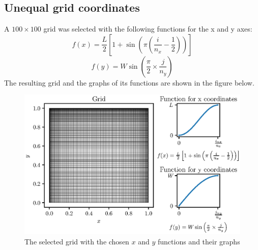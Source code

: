 \documentclass[12pt,a4paper,fleqn]{article}
\begin{document}
    \subsection*{Unequal grid coordinates}
    A $100\times100$ grid was selected with the following functions for the x and y axes:
    \begin{equation} \label{eq:xcoordinates}
    f(x)=\frac{L}{2}\left[ 1 + \sin\left(\pi\left(\frac{i}{n_x} -
    \frac{1}{2}\right)\right)\right]
    \end{equation}
    \begin{equation} \label{eq:ycoordinates}
    f(y)=W\sin\left(\frac{\pi}{2}\times\frac{j}{n_y}\right)
    \end{equation}
    The resulting grid and the graphs of its functions are shown in the figure below.
    \begin{figure}
        \centering
        \includegraphics[width=\linewidth]{../figures/gridAndGraph.eps}
        \caption{The selected grid with the chosen $x$ and $y$ functions and their graphs}
        \label{fig:gridandgraphs}
    \end{figure}
    
\end{document}
